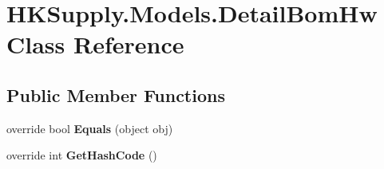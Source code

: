 \hypertarget{class_h_k_supply_1_1_models_1_1_detail_bom_hw}{}\section{H\+K\+Supply.\+Models.\+Detail\+Bom\+Hw Class Reference}
\label{class_h_k_supply_1_1_models_1_1_detail_bom_hw}
\subsection*{Public Member Functions}
\begin{DoxyCompactItemize}
\item 
\mbox{\label{class_h_k_supply_1_1_models_1_1_detail_bom_hw_a9ae175f7f56f6428e06b35a03e27216f}} 
override bool {\bfseries Equals} (object obj)
\item 
\mbox{\label{class_h_k_supply_1_1_models_1_1_detail_bom_hw_a8fd105458c6771a2f52e987146458ac2}} 
override int {\bfseries Get\+Hash\+Code} ()
\end{DoxyCompactItemize}
